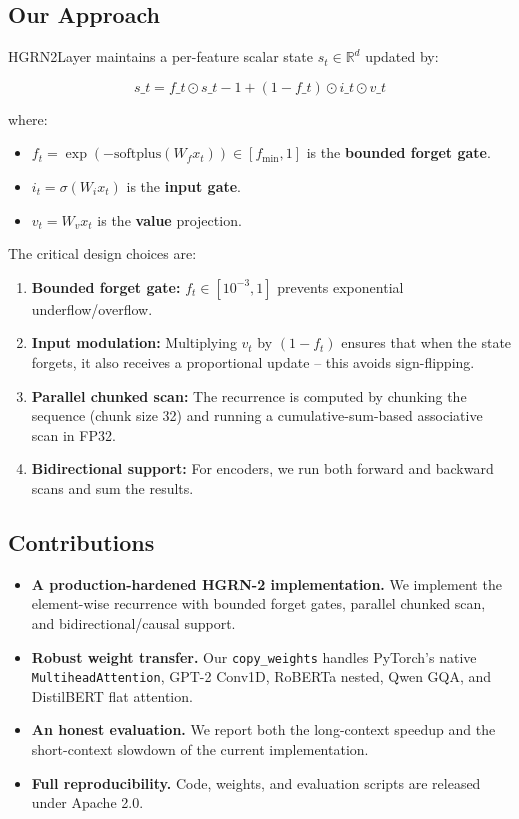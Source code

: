 \subsection{Our Approach}

HGRN2Layer maintains a per-feature scalar state $s_t \in \mathbb{R}^d$ 
updated by:

\[
s\_t = f\_t \odot s\_{t-1} + (1 - f\_t) \odot i\_t \odot v\_t
\tag{1.1}
\]

where:

\begin{itemize}
\item $f_t = \exp(-\text{softplus}(W_f x_t)) \in [f_\text{min}, 1]$ is the
  \textbf{bounded forget gate}.
\item $i_t = \sigma(W_i x_t)$ is the \textbf{input gate}.
\item $v_t = W_v x_t$ is the \textbf{value} projection.

\end{itemize}
The critical design choices are:

\begin{enumerate}
\item \textbf{Bounded forget gate:} $f_t \in [10^{-3}, 1]$ prevents exponential
  underflow/overflow.
\item \textbf{Input modulation:} Multiplying $v_t$ by $(1 - f_t)$ ensures that when
  the state forgets, it also receives a proportional update -- this avoids
  sign-flipping.
\item \textbf{Parallel chunked scan:} The recurrence is computed by chunking the
  sequence (chunk size 32) and running a cumulative-sum-based associative
  scan in FP32.
\item \textbf{Bidirectional support:} For encoders, we run both forward and backward
  scans and sum the results.

\end{enumerate}
\subsection{Contributions}

\begin{itemize}
\item \textbf{A production-hardened HGRN-2 implementation.} We implement the
  element-wise recurrence with bounded forget gates, parallel chunked scan,
  and bidirectional/causal support.
\item \textbf{Robust weight transfer.} Our \texttt{copy\_weights} handles PyTorch's native
  \texttt{MultiheadAttention}, GPT-2 Conv1D, RoBERTa nested, Qwen GQA, and
  DistilBERT flat attention.
\item \textbf{An honest evaluation.} We report both the long-context speedup and the
  short-context slowdown of the current implementation.
\item \textbf{Full reproducibility.} Code, weights, and evaluation scripts are
  released under Apache 2.0.

\end{itemize}

